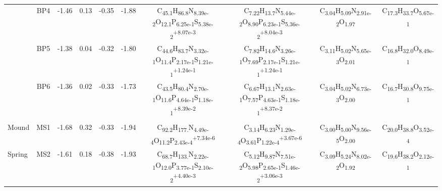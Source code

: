 \begin{landscape}
\begin{table}
\begin{adjustbox}{width=600pt,keepaspectratio}
\begin{threeparttable}
\begin{tabular}{lccccccccc}
      & BP4   & -1.46 & 0.13  & -0.35 & -1.88 & C\textsubscript{45.1}H\textsubscript{86.8}N\textsubscript{8.39e-2}O\textsubscript{12.1}P\textsubscript{6.25e-1}S\textsubscript{5.38e-2}\textsuperscript{+8.07e-3} & C\textsubscript{7.22}H\textsubscript{13.7}N\textsubscript{5.44e-2}O\textsubscript{8.90}P\textsubscript{6.23e-1}S\textsubscript{5.36e-2}\textsuperscript{+8.04e-3} & C\textsubscript{3.04}H\textsubscript{5.09}N\textsubscript{2.91e-2}O\textsubscript{1.97} & C\textsubscript{17.3}H\textsubscript{33.7}O\textsubscript{5.67e-1} \\
      & BP5   & -1.38 & 0.04  & -0.32 & -1.80 & C\textsubscript{44.6}H\textsubscript{83.7}N\textsubscript{3.32e-1}O\textsubscript{11.4}P\textsubscript{2.17e-1}S\textsubscript{1.21e-1}\textsuperscript{+1.24e-1} & C\textsubscript{7.82}H\textsubscript{14.6}N\textsubscript{3.26e-1}O\textsubscript{7.69}P\textsubscript{2.17e-1}S\textsubscript{1.21e-1}\textsuperscript{+1.24e-1} & C\textsubscript{3.11}H\textsubscript{5.02}N\textsubscript{5.65e-3}O\textsubscript{2.01} & C\textsubscript{16.8}H\textsubscript{32.0}O\textsubscript{8.49e-1} \\
      & BP6   & -1.36 & 0.02  & -0.33 & -1.73 & C\textsubscript{43.5}H\textsubscript{80.4}N\textsubscript{2.70e-1}O\textsubscript{11.6}P\textsubscript{4.64e-1}S\textsubscript{1.18e-1}\textsuperscript{+8.39e-2} & C\textsubscript{6.67}H\textsubscript{13.1}N\textsubscript{2.63e-1}O\textsubscript{7.57}P\textsubscript{4.63e-1}S\textsubscript{1.18e-1}\textsuperscript{+8.37e-2} & C\textsubscript{3.04}H\textsubscript{5.02}N\textsubscript{6.73e-3}O\textsubscript{2.00} & C\textsubscript{16.7}H\textsubscript{30.8}O\textsubscript{9.75e-1} \\
      &       &       &       &       &       &       &       &       &  \\
Mound & MS1   & -1.68 & 0.32  & -0.33 & -1.94 & C\textsubscript{92.2}H\textsubscript{177.}N\textsubscript{4.49e-4}O\textsubscript{11.2}P\textsubscript{2.43e-4}\textsuperscript{+7.34e-6} & C\textsubscript{3.14}H\textsubscript{6.23}N\textsubscript{1.29e-4}O\textsubscript{3.61}P\textsubscript{1.22e-4}\textsuperscript{+3.67e-6} & C\textsubscript{3.00}H\textsubscript{5.00}N\textsubscript{9.56e-5}O\textsubscript{2.00} & C\textsubscript{20.0}H\textsubscript{38.8}O\textsubscript{3.52e-4} \\
Spring & MS2   & -1.61 & 0.18  & -0.38 & -1.93 & C\textsubscript{68.7}H\textsubscript{133.}N\textsubscript{2.22e-1}O\textsubscript{12.0}P\textsubscript{3.77e-1}S\textsubscript{2.10e-2}\textsuperscript{+4.40e-3} & C\textsubscript{5.12}H\textsubscript{9.87}N\textsubscript{7.51e-2}O\textsubscript{5.98}P\textsubscript{2.65e-1}S\textsubscript{1.46e-2}\textsuperscript{+3.06e-3} & C\textsubscript{3.09}H\textsubscript{5.24}N\textsubscript{8.02e-2}O\textsubscript{1.92} & C\textsubscript{19.6}H\textsubscript{38.2}O\textsubscript{2.12e-1} \\

\end{tabular}
\end{threeparttable}
\end{adjustbox}
\end{table}
\end{landscape}
